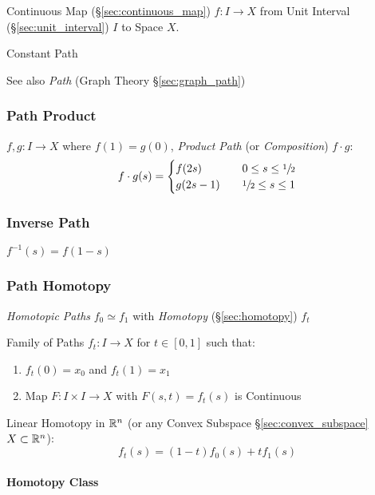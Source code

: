 Continuous Map (\S\ref{sec:continuous_map}) $f : I \rightarrow X$ from
Unit Interval (\S\ref{sec:unit_interval}) $I$ to Space $X$.

Constant Path %

\fist See also \emph{Path} (Graph Theory \S\ref{sec:graph_path})



\subsubsection{Path Product}\label{sec:path_product}

$f,g : I \rightarrow X$ where $f(1) = g(0)$, \emph{Product Path} (or
\emph{Composition}) $f \cdot g$:
\[
  f \cdot g (s) =
  \begin{cases}
    f(2s)   & \quad 0 \leq s \leq \sfrac{1}{2} \\
    g(2s-1) & \quad \sfrac{1}{2} \leq s \leq 1 \\
  \end{cases}
\]



\subsubsection{Inverse Path}\label{sec:inverse_path}

$f^{-1}(s) = f(1-s)$



\subsubsection{Path Homotopy}\label{sec:path_homotopy}

\emph{Homotopic Paths} $f_0 \simeq f_1$ with \emph{Homotopy}
(\S\ref{sec:homotopy}) $f_t$

Family of Paths $f_t : I \rightarrow X$ for $t \in [0,1]$ such that:
\begin{enumerate}
  \item $f_t(0) = x_0$ and $f_t(1) = x_1$
  \item Map $F : I \times I \rightarrow X$ with $F(s,t) = f_t(s)$ is
    Continuous
\end{enumerate}

Linear Homotopy in $\mathbb{R}^n$ (or any Convex Subspace
\S\ref{sec:convex_subspace} $X \subset \mathbb{R}^n$):
\[
  f_t(s) = (1 - t) f_0(s) + t f_1(s)
\]



\paragraph{Homotopy Class}\label{sec:homotopy_class}\hfill

